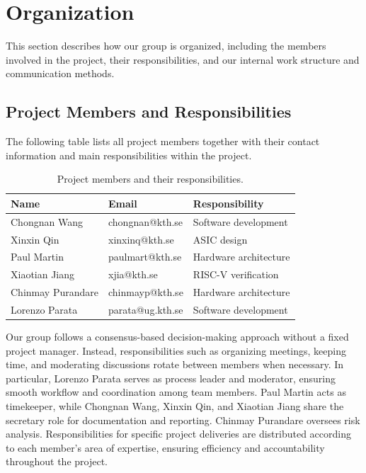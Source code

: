 \documentclass[10pt]{article}
\begin{document}
\section{Organization}

This section describes how our group is organized, including the members involved in the project, their responsibilities, and our internal work structure and communication methods.

\subsection{Project Members and Responsibilities}

The following table lists all project members together with their contact information and main responsibilities within the project.

\begin{table}[H]
\centering
\begin{tabular}{|l|l|l|}
\hline
\textbf{Name} & \textbf{Email} & \textbf{Responsibility} \\ \hline
Chongnan Wang & chongnan@kth.se & Software development \\ \hline
Xinxin Qin & xinxinq@kth.se & ASIC design \\ \hline
Paul Martin & paulmart@kth.se & Hardware architecture \\ \hline
Xiaotian Jiang & xjia@kth.se & RISC-V verification \\ \hline
Chinmay Purandare & chinmayp@kth.se & Hardware architecture \\ \hline
Lorenzo Parata & parata@ug.kth.se & Software development \\ \hline
\end{tabular}
\caption{Project members and their responsibilities.}
\end{table}

Our group follows a consensus-based decision-making approach without a fixed project manager. Instead, responsibilities such as organizing meetings, keeping time, and moderating discussions rotate between members when necessary.  
In particular, Lorenzo Parata serves as process leader and moderator, ensuring smooth workflow and coordination among team members. Paul Martin acts as timekeeper, while Chongnan Wang, Xinxin Qin, and Xiaotian Jiang share the secretary role for documentation and reporting. Chinmay Purandare oversees risk analysis.  
Responsibilities for specific project deliveries are distributed according to each member’s area of expertise, ensuring efficiency and accountability throughout the project.
\end{document}
